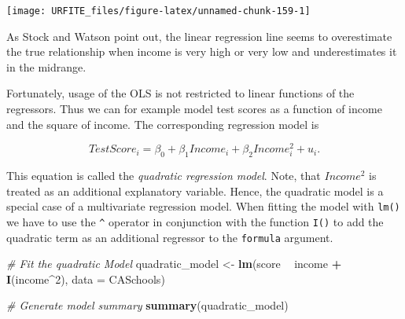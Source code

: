 \documentclass[]{book}
\newenvironment{Shaded}{\begin{snugshade}}{\end{snugshade}}
\newcommand{\KeywordTok}[1]{\textcolor[rgb]{0.13,0.29,0.53}{\textbf{#1}}}
\newcommand{\DataTypeTok}[1]{\textcolor[rgb]{0.13,0.29,0.53}{#1}}
\newcommand{\DecValTok}[1]{\textcolor[rgb]{0.00,0.00,0.81}{#1}}
\newcommand{\StringTok}[1]{\textcolor[rgb]{0.31,0.60,0.02}{#1}}
\newcommand{\CommentTok}[1]{\textcolor[rgb]{0.56,0.35,0.01}{\textit{#1}}}
\newcommand{\OperatorTok}[1]{\textcolor[rgb]{0.81,0.36,0.00}{\textbf{#1}}}
\newcommand{\NormalTok}[1]{#1}
\theoremstyle{definition}
\theoremstyle{definition}
\theoremstyle{definition}
\theoremstyle{remark}
\begin{document}
\begin{Shaded}
\end{Shaded}

\begin{center}\texttt{[image: URFITE\_files/figure-latex/unnamed-chunk-159-1]} \end{center}

As Stock and Watson point out, the linear regression line seems to
overestimate the true relationship when income is very high or very low
and underestimates it in the midrange.

Fortunately, usage of the OLS is not restricted to linear functions of
the regressors. Thus we can for example model test scores as a function
of income and the square of income. The corresponding regression model
is

\[TestScore_i = \beta_0 + \beta_1 Income_i + \beta_2 Income_i^2 + u_i.\]

This equation is called the \emph{quadratic regression model}. Note,
that \(Income^2\) is treated as an additional explanatory variable.
Hence, the quadratic model is a special case of a multivariate
regression model. When fitting the model with \texttt{lm()} we have to
use the \texttt{\^{}} operator in conjunction with the function
\texttt{I()} to add the quadratic term as an additional regressor to the
\texttt{formula} argument.

\begin{Shaded}
\begin{Highlighting}[]
\CommentTok{# Fit the quadratic Model}
\NormalTok{quadratic_model <-}\StringTok{ }\KeywordTok{lm}\NormalTok{(score }\OperatorTok{~}\StringTok{ }\NormalTok{income }\OperatorTok{+}\StringTok{ }\KeywordTok{I}\NormalTok{(income}\OperatorTok{^}\DecValTok{2}\NormalTok{), }\DataTypeTok{data =}\NormalTok{ CASchools)}

\CommentTok{# Generate model summary}
\KeywordTok{summary}\NormalTok{(quadratic_model)}
\end{Highlighting}
\end{Shaded}
\end{document}
